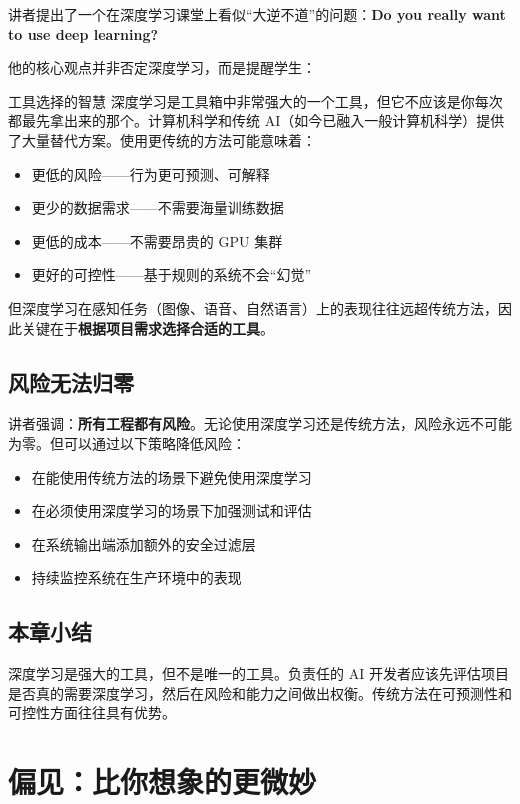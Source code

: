 \documentclass[a4paper]{article}
\begin{document}
讲者提出了一个在深度学习课堂上看似``大逆不道''的问题：\textbf{Do you really want to use deep learning?}

他的核心观点并非否定深度学习，而是提醒学生：

\begin{knowledgebox}{工具选择的智慧}
深度学习是工具箱中非常强大的一个工具，但它不应该是你每次都最先拿出来的那个。计算机科学和传统 AI（如今已融入一般计算机科学）提供了大量替代方案。使用更传统的方法可能意味着：
\begin{itemize}
    \item 更低的风险——行为更可预测、可解释
    \item 更少的数据需求——不需要海量训练数据
    \item 更低的成本——不需要昂贵的 GPU 集群
    \item 更好的可控性——基于规则的系统不会``幻觉''
\end{itemize}
但深度学习在感知任务（图像、语音、自然语言）上的表现往往远超传统方法，因此关键在于\textbf{根据项目需求选择合适的工具}。
\end{knowledgebox}

\subsection{风险无法归零}

讲者强调：\textbf{所有工程都有风险}。无论使用深度学习还是传统方法，风险永远不可能为零。但可以通过以下策略降低风险：

\begin{itemize}
    \item 在能使用传统方法的场景下避免使用深度学习
    \item 在必须使用深度学习的场景下加强测试和评估
    \item 在系统输出端添加额外的安全过滤层
    \item 持续监控系统在生产环境中的表现
\end{itemize}

\subsection{本章小结}

深度学习是强大的工具，但不是唯一的工具。负责任的 AI 开发者应该先评估项目是否真的需要深度学习，然后在风险和能力之间做出权衡。传统方法在可预测性和可控性方面往往具有优势。

\section{偏见：比你想象的更微妙}
\end{document}
